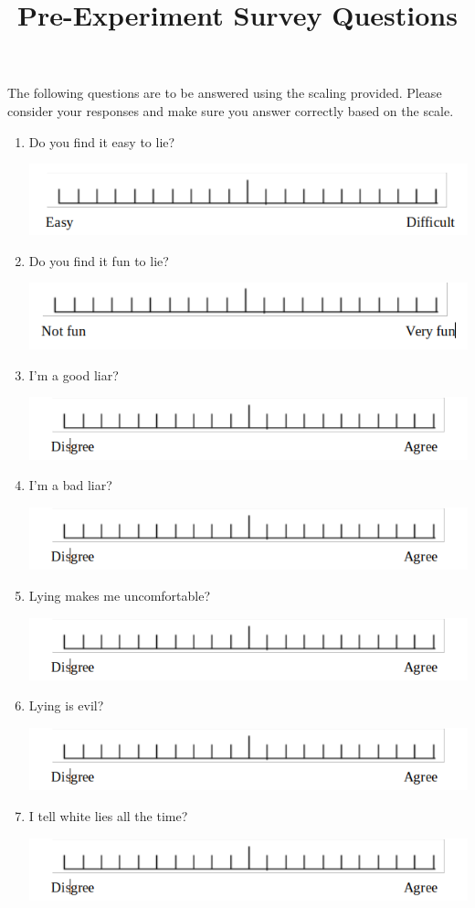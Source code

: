 \documentclass[11pt]{article}
\title{Pre-Experiment Survey Questions}
\date{}
\author{}
\begin{document}
  \maketitle
  The following questions are to be answered using the scaling provided. Please consider your responses and make sure you answer correctly based on the scale. 

  \begin{enumerate}
	  \item Do you find it easy to lie?

		  \includegraphics[width=\textwidth]{Easy-Difficult}
	  \item Do you find it fun to lie?

		  \includegraphics[width=\textwidth]{fun}
	  \item I'm a good liar?

		  \includegraphics[width=\textwidth]{Agree-Disagree}
	  \item I'm a bad liar?

		  \includegraphics[width=\textwidth]{Agree-Disagree}
	  \item Lying makes me uncomfortable?

		  \includegraphics[width=\textwidth]{Agree-Disagree}
	  \item Lying is evil?

		  \includegraphics[width=\textwidth]{Agree-Disagree}
	  \item I tell white lies all the time?

		  \includegraphics[width=\textwidth]{Agree-Disagree}

  \end{enumerate}
\end{document}
